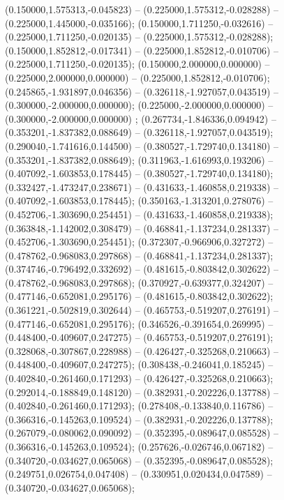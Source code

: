  (0.150000,1.575313,-0.045823) -- (0.225000,1.575312,-0.028288) -- (0.225000,1.445000,-0.035166);
 (0.150000,1.711250,-0.032616) -- (0.225000,1.711250,-0.020135) -- (0.225000,1.575312,-0.028288);
 (0.150000,1.852812,-0.017341) -- (0.225000,1.852812,-0.010706) -- (0.225000,1.711250,-0.020135);
 (0.150000,2.000000,0.000000) -- (0.225000,2.000000,0.000000) -- (0.225000,1.852812,-0.010706);
 (0.245865,-1.931897,0.046356) -- (0.326118,-1.927057,0.043519) -- (0.300000,-2.000000,0.000000);
 (0.225000,-2.000000,0.000000) -- (0.300000,-2.000000,0.000000) ;
 (0.267734,-1.846336,0.094942) -- (0.353201,-1.837382,0.088649) -- (0.326118,-1.927057,0.043519);
 (0.290040,-1.741616,0.144500) -- (0.380527,-1.729740,0.134180) -- (0.353201,-1.837382,0.088649);
 (0.311963,-1.616993,0.193206) -- (0.407092,-1.603853,0.178445) -- (0.380527,-1.729740,0.134180);
 (0.332427,-1.473247,0.238671) -- (0.431633,-1.460858,0.219338) -- (0.407092,-1.603853,0.178445);
 (0.350163,-1.313201,0.278076) -- (0.452706,-1.303690,0.254451) -- (0.431633,-1.460858,0.219338);
 (0.363848,-1.142002,0.308479) -- (0.468841,-1.137234,0.281337) -- (0.452706,-1.303690,0.254451);
 (0.372307,-0.966906,0.327272) -- (0.478762,-0.968083,0.297868) -- (0.468841,-1.137234,0.281337);
 (0.374746,-0.796492,0.332692) -- (0.481615,-0.803842,0.302622) -- (0.478762,-0.968083,0.297868);
 (0.370927,-0.639377,0.324207) -- (0.477146,-0.652081,0.295176) -- (0.481615,-0.803842,0.302622);
 (0.361221,-0.502819,0.302644) -- (0.465753,-0.519207,0.276191) -- (0.477146,-0.652081,0.295176);
 (0.346526,-0.391654,0.269995) -- (0.448400,-0.409607,0.247275) -- (0.465753,-0.519207,0.276191);
 (0.328068,-0.307867,0.228988) -- (0.426427,-0.325268,0.210663) -- (0.448400,-0.409607,0.247275);
 (0.308438,-0.246041,0.185245) -- (0.402840,-0.261460,0.171293) -- (0.426427,-0.325268,0.210663);
 (0.292014,-0.188849,0.148120) -- (0.382931,-0.202226,0.137788) -- (0.402840,-0.261460,0.171293);
 (0.278408,-0.133840,0.116786) -- (0.366316,-0.145263,0.109524) -- (0.382931,-0.202226,0.137788);
 (0.267079,-0.080062,0.090092) -- (0.352395,-0.089647,0.085528) -- (0.366316,-0.145263,0.109524);
 (0.257626,-0.026746,0.067182) -- (0.340720,-0.034627,0.065068) -- (0.352395,-0.089647,0.085528);
 (0.249751,0.026754,0.047408) -- (0.330951,0.020434,0.047589) -- (0.340720,-0.034627,0.065068);
